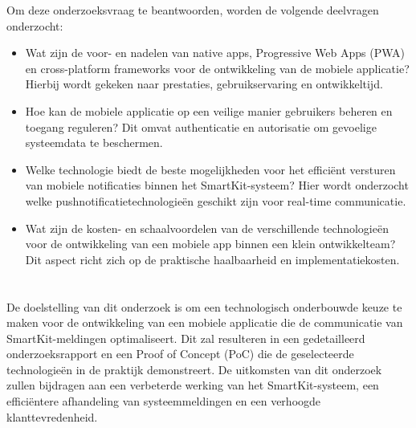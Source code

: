 \noindent Om deze onderzoeksvraag te beantwoorden, worden de volgende deelvragen onderzocht:

\begin{itemize}
    \item Wat zijn de voor- en nadelen van native apps, Progressive Web Apps (PWA) en cross-platform frameworks voor de ontwikkeling van de mobiele applicatie? Hierbij wordt gekeken naar prestaties, gebruikservaring en ontwikkeltijd.
    \item Hoe kan de mobiele applicatie op een veilige manier gebruikers beheren en toegang reguleren? Dit omvat authenticatie en autorisatie om gevoelige systeemdata te beschermen.
    \item Welke technologie biedt de beste mogelijkheden voor het efficiënt versturen van mobiele notificaties binnen het SmartKit-systeem? Hier wordt onderzocht welke pushnotificatietechnologieën geschikt zijn voor real-time communicatie.
    \item Wat zijn de kosten- en schaalvoordelen van de verschillende technologieën voor de ontwikkeling van een mobiele app binnen een klein ontwikkelteam? Dit aspect richt zich op de praktische haalbaarheid en implementatiekosten.
\end{itemize}

\section{}%
\label{sec:onderzoeksdoelstelling}

\noindent De doelstelling van dit onderzoek is om een technologisch onderbouwde keuze te maken voor de ontwikkeling van een mobiele applicatie die de communicatie van SmartKit-meldingen optimaliseert. Dit zal resulteren in een gedetailleerd onderzoeksrapport en een Proof of Concept (PoC) die de geselecteerde technologieën in de praktijk demonstreert. De uitkomsten van dit onderzoek zullen bijdragen aan een verbeterde werking van het SmartKit-systeem, een efficiëntere afhandeling van systeemmeldingen en een verhoogde klanttevredenheid. \\

\section{}%
\label{sec:opzet-bachelorproef}

